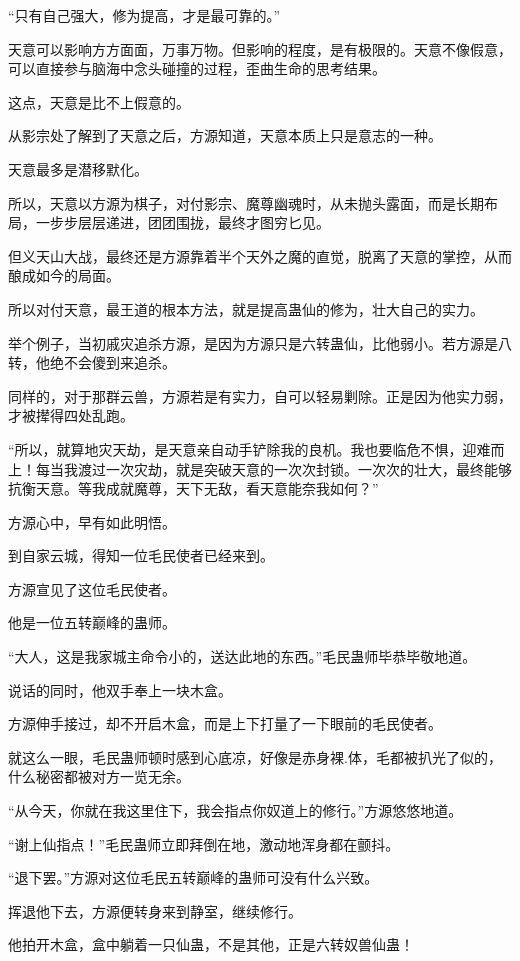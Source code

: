 \begin{this_body}
“只有自己强大，修为提高，才是最可靠的。”

天意可以影响方方面面，万事万物。但影响的程度，是有极限的。天意不像假意，可以直接参与脑海中念头碰撞的过程，歪曲生命的思考结果。

这点，天意是比不上假意的。

从影宗处了解到了天意之后，方源知道，天意本质上只是意志的一种。

天意最多是潜移默化。

所以，天意以方源为棋子，对付影宗、魔尊幽魂时，从未抛头露面，而是长期布局，一步步层层递进，团团围拢，最终才图穷匕见。

但义天山大战，最终还是方源靠着半个天外之魔的直觉，脱离了天意的掌控，从而酿成如今的局面。

所以对付天意，最王道的根本方法，就是提高蛊仙的修为，壮大自己的实力。

举个例子，当初戚灾追杀方源，是因为方源只是六转蛊仙，比他弱小。若方源是八转，他绝不会傻到来追杀。

同样的，对于那群云兽，方源若是有实力，自可以轻易剿除。正是因为他实力弱，才被撵得四处乱跑。

“所以，就算地灾天劫，是天意亲自动手铲除我的良机。我也要临危不惧，迎难而上！每当我渡过一次灾劫，就是突破天意的一次次封锁。一次次的壮大，最终能够抗衡天意。等我成就魔尊，天下无敌，看天意能奈我如何？”

方源心中，早有如此明悟。

到自家云城，得知一位毛民使者已经来到。

方源宣见了这位毛民使者。

他是一位五转巅峰的蛊师。

“大人，这是我家城主命令小的，送达此地的东西。”毛民蛊师毕恭毕敬地道。

说话的同时，他双手奉上一块木盒。

方源伸手接过，却不开启木盒，而是上下打量了一下眼前的毛民使者。

就这么一眼，毛民蛊师顿时感到心底凉，好像是赤身裸.体，毛都被扒光了似的，什么秘密都被对方一览无余。

“从今天，你就在我这里住下，我会指点你奴道上的修行。”方源悠悠地道。

“谢上仙指点！”毛民蛊师立即拜倒在地，激动地浑身都在颤抖。

“退下罢。”方源对这位毛民五转巅峰的蛊师可没有什么兴致。

挥退他下去，方源便转身来到静室，继续修行。

他拍开木盒，盒中躺着一只仙蛊，不是其他，正是六转奴兽仙蛊！


\end{this_body}
